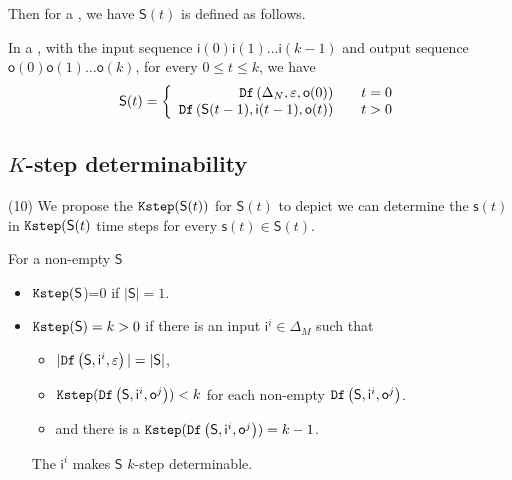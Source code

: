  Then for a \BCN, we have $\mathsf{S}(t)$ is defined as follows.
 \begin{definition}[$\mathsf{S}(t)$] In a \BCN, with the input sequence $\mathsf{i}(0)\mathsf{i}(1)\ldots\mathsf{i}(k-1)$ and output sequence $\mathsf{o}(0)\mathsf{o}(1)\ldots\mathsf{o}(k)$, for every $0\le t\le k$, we have
	\[\mathsf{S}(t)=\left\{
\begin{array}{rcl}
{\tt Df}\left(\Delta_N,\varepsilon,\mathsf{o}(0)\right)      &      & {t=0}\\
{\tt Df}\left(\mathsf{S}(t-1),\mathsf{i}(t-1),\mathsf{o}(t)\right)       &      & {t>0}
\end{array} \right. \]

\end{definition}
 
 
\subsection{$K$-step determinability}
{\color{red} (10)} We propose the ${\tt Kstep}(\mathsf{S}(t))$ for $\mathsf{S}(t)$ to depict we can determine the $\mathsf{s}(t)$ in ${\tt Kstep}(\mathsf{S}(t)$ time steps for every $\mathsf{s}(t)\in \mathsf{S}(t)$. 
\begin{definition}[$\Ks(\mathsf{S}$)] 
For a non-empty $\mathsf{S}$
 \begin{itemize}
 \item  $\Ks(\mathsf{S}$)=0   if $|\mathsf{S}|=1$. 
 \item  ${\tt Kstep}(\mathsf{S})=k>0$
 if there is an input $\mathsf{i}^{i} \in \Delta_M$ such that
 \begin{itemize}
 \item  $|{\tt Df}\left(\mathsf{S},\mathsf{i}^{i},\varepsilon\right)|=|\mathsf{S}|$,
 \item  ${\tt Kstep}({\tt Df}\left(\mathsf{S},\mathsf{i}^{i},\mathsf{o}^{j}\right))< k$ for each non-empty ${\tt Df}\left(\mathsf{S},\mathsf{i}^{i},\mathsf{o}^{j}\right)$.
 \item and there is a ${\tt Kstep}({\tt Df}\left(\mathsf{S},\mathsf{i}^{i},\mathsf{o}^{j}\right))= k-1$.
 \end{itemize}
 The $\mathsf{i}^{i}$ makes $\mathsf{S}$ $k$-step determinable.
 \end{itemize}
\end{definition}

